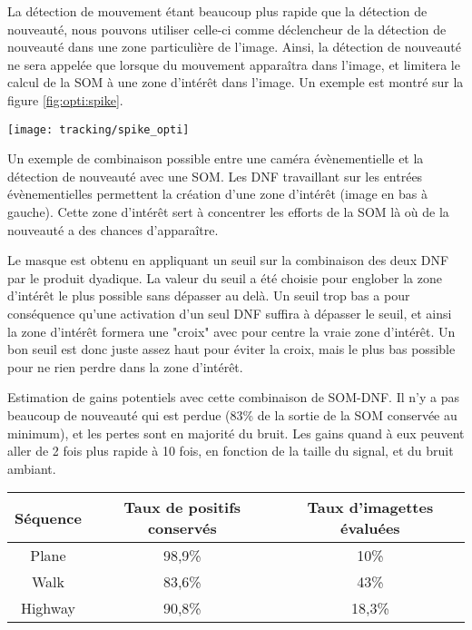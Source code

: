 	La détection de mouvement étant beaucoup plus rapide que la détection de nouveauté, nous pouvons utiliser celle-ci comme déclencheur de la détection de nouveauté dans une zone particulière de l'image. Ainsi, la détection de nouveauté ne sera appelée que lorsque du mouvement apparaîtra dans l'image, et limitera le calcul de la SOM à une zone d'intérêt dans l'image. Un exemple est montré sur la figure \ref{fig:opti:spike}.

	\begin{figureth}
		\begin{subfigureth}{\textwidth}
			\texttt{[image: tracking/spike\_opti]}
		\end{subfigureth}
		\caption[Combinaison SOM et DNF par zone d'intérêt]{Un exemple de combinaison possible entre une caméra évènementielle et la détection de nouveauté avec une SOM. Les DNF travaillant sur les entrées évènementielles permettent la création d'une zone d'intérêt (image en bas à gauche). Cette zone d'intérêt sert à concentrer les efforts de la SOM là où de la nouveauté a des chances d'apparaître.}\label{fig:opti:spike}
	\end{figureth}

	Le masque est obtenu en appliquant un seuil sur la combinaison des deux DNF par le produit dyadique. La valeur du seuil a été choisie pour englober la zone d'intérêt le plus possible sans dépasser au delà. Un seuil trop bas a pour conséquence qu'une activation d'un seul DNF suffira à dépasser le seuil, et ainsi la zone d'intérêt formera une "croix" avec pour centre la vraie zone d'intérêt. Un bon seuil est donc juste assez haut pour éviter la croix, mais le plus bas possible pour ne rien perdre dans la zone d'intérêt.

	\begin{tableth}
	\caption[Gains grâce à la combinaison SOM-DNF]{Estimation de gains potentiels avec cette combinaison de SOM-DNF. Il n'y a pas beaucoup de nouveauté qui est perdue (83\% de la sortie de la SOM conservée au minimum), et les pertes sont en majorité du bruit. Les gains quand à eux peuvent aller de 2 fois plus rapide à 10 fois, en fonction de la taille du signal, et du bruit ambiant.}
	\begin{tabular}{|c|c|c|}
		\hline
		Séquence & Taux de positifs conservés & Taux d'imagettes évaluées\\
		\hline
		Plane & 98,9\% & 10\% \\
		Walk & 83,6\% & 43\% \\
		Highway & 90,8\% & 18,3\% \\
		\hline
	\end{tabular}
	\label{tab:nbr:optidnf}
	\end{tableth}

